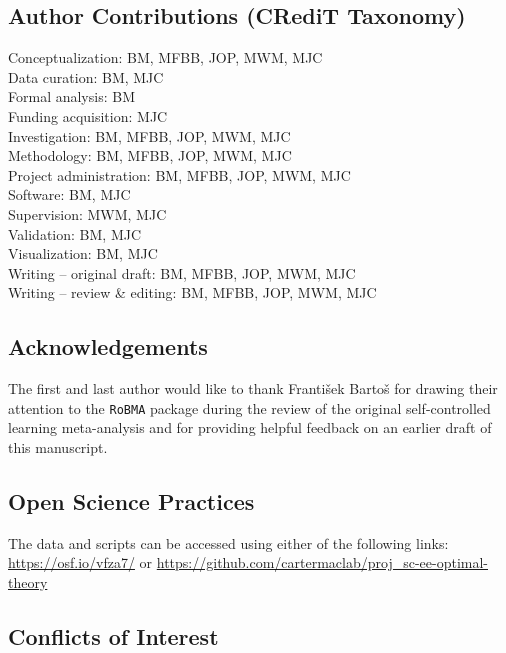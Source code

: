 \documentclass[
  doc, donotrepeattitle,floatsintext]{apa7}
\begin{document}
\vfill

\hypertarget{author-contributions-credit-taxonomy}{%
\subsection{Author Contributions (CRediT Taxonomy)}\label{author-contributions-credit-taxonomy}}

\noindent Conceptualization: BM, MFBB, JOP, MWM, MJC\\
Data curation: BM, MJC\\
Formal analysis: BM\\
Funding acquisition: MJC\\
Investigation: BM, MFBB, JOP, MWM, MJC\\
Methodology: BM, MFBB, JOP, MWM, MJC\\
Project administration: BM, MFBB, JOP, MWM, MJC\\
Software: BM, MJC\\
Supervision: MWM, MJC\\
Validation: BM, MJC\\
Visualization: BM, MJC\\
Writing -- original draft: BM, MFBB, JOP, MWM, MJC\\
Writing -- review \& editing: BM, MFBB, JOP, MWM, MJC

\hypertarget{acknowledgements}{%
\subsection{Acknowledgements}\label{acknowledgements}}

\noindent The first and last author would like to thank František Bartoš for drawing their attention to the \texttt{RoBMA} package during the review of the original self-controlled learning meta-analysis and for providing helpful feedback on an earlier draft of this manuscript.

\hypertarget{open-science-practices}{%
\subsection{Open Science Practices}\label{open-science-practices}}

\noindent The data and scripts can be accessed using either of the following links: \url{https://osf.io/vfza7/} or \url{https://github.com/cartermaclab/proj_sc-ee-optimal-theory}

\hypertarget{conflicts-of-interest}{%
\subsection{Conflicts of Interest}\label{conflicts-of-interest}}
\end{document}
